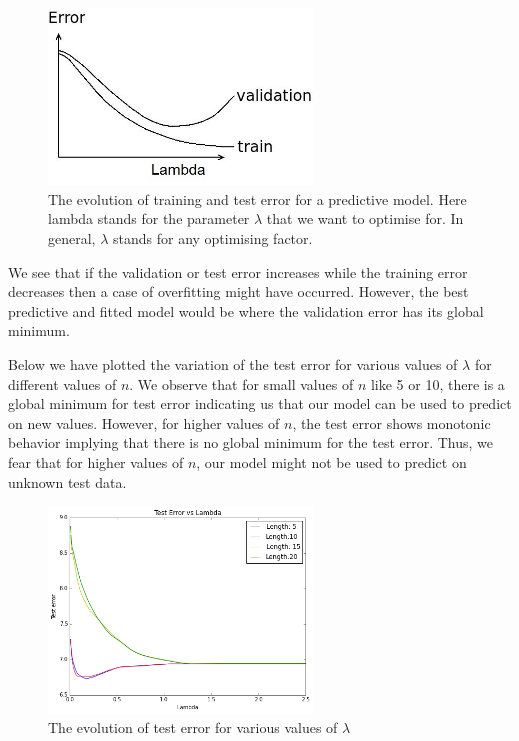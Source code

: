 \documentclass[a4paper, 12pt]{article}
\begin{document}
\begin{enumerate}
\begin{figure}[!h]
\centering 
\label{overfitting}
\includegraphics[width=7cm]{Images/overfitting.jpeg}
\caption{The evolution of training and test error for a predictive model. Here lambda stands for the parameter $\lambda$ that we want to optimise for. In general, $\lambda$ stands for any optimising factor.}
\end{figure} 

We see that if the validation or test error increases while the training error decreases then a case of overfitting might have occurred. However, the best predictive and fitted model would be where the validation error has its global minimum. 

Below we have plotted the variation of the test error for various values of $\lambda$ for different values of $n$. We observe that for small values of $n$ like 5 or 10, there is a global minimum for test error indicating us that our model can be used to predict on new values. However, for higher values of $n$, the test error shows monotonic behavior implying that there is no global minimum for the test error. Thus, we fear that for higher values of $n$, our model might not be used to predict on unknown test data. 

\begin{figure}[!h]
\centering
\label{test_error_lambda_1}
\includegraphics[width=7cm]{Images/test_error_lambda.png}
\caption{The evolution of test error for various values of $\lambda$}
\end{figure}


\end{enumerate}
\end{document}
